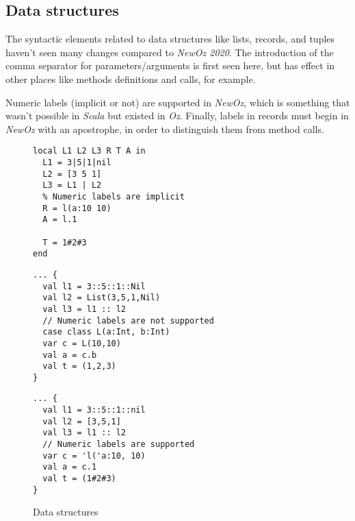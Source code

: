 \subsection{Data structures}
The syntactic elements related to data structures like lists, records, and tuples haven't seen many changes compared to \textit{NewOz 2020}.
The introduction of the comma separator for parameters/arguments is first seen here, but has effect in other places like methods definitions and calls, for example.\newline

Numeric labels (implicit or not) are supported in \textit{NewOz}, which is something that wasn't possible in \textit{Scala} but existed in \textit{Oz}.
Finally, labels in records must begin in \textit{NewOz} with an apostrophe, in order to distinguish them from method calls.
\begin{figure}
    \caption{Data structures}
    \noindent\begin{minipage}{.49\textwidth}
        \begin{lstlisting}[title={Oz},language=oz]
local L1 L2 L3 R T A in
  L1 = 3|5|1|nil
  L2 = [3 5 1]
  L3 = L1 | L2
  % Numeric labels are implicit
  R = l(a:10 10)
  A = l.1

  T = 1#2#3
end
        \end{lstlisting}
    \end{minipage}
    \hfill
    \noindent\begin{minipage}{.49\textwidth}
        \begin{lstlisting}[title={Scala/Ozma}]
... {
  val l1 = 3::5::1::Nil
  val l2 = List(3,5,1,Nil)
  val l3 = l1 :: l2
  // Numeric labels are not supported
  case class L(a:Int, b:Int)
  var c = L(10,10)
  val a = c.b
  val t = (1,2,3)
}
        \end{lstlisting}
    \end{minipage}
    \begin{center}
    \noindent\begin{minipage}{.89\textwidth}
        \begin{lstlisting}[title={NewOz 2020/2021},language=newoz]
... {
  val l1 = 3::5::1::nil
  val l2 = [3,5,1]
  val l3 = l1 :: l2
  // Numeric labels are supported
  var c = 'l('a:10, 10)
  val a = c.1
  val t = (1#2#3)
}
        \end{lstlisting}
    \end{minipage}
    \end{center}
\end{figure}

